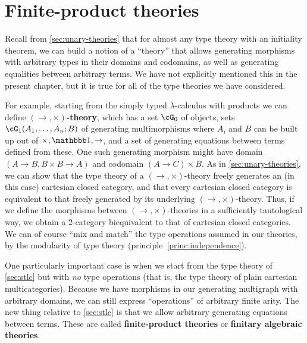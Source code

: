 \section{Finite-product theories}
\label{sec:fp-theories}

Recall from \cref{sec:unary-theories} that for almost any type theory with an initiality theorem, we can build a notion of a ``theory'' that allows generating morphisms with arbitrary types in their domains and codomains, as well as generating equalities between arbitrary terms.
We have not explicitly mentioned this in the present chapter, but it is true for all of the type theories we have considered.

For example, starting from the simply typed $\lambda$-calculus with products we can define \textbf{$(\to,\times)$-theory}, which has a set $\cG_0$ of objects, sets $\cG_1(A_1,\dots,A_n;B)$ of generating multimorphisms where $A_i$ and $B$ can be built up out of $\times,\unit,\to$, and a set of generating equations between terms defined from these.
One such generating morphism might have domain $(A\to B, B\times B\to A)$ and codomain $(A\to C)\times B$.
As in \cref{sec:unary-theories}, we can show that the type theory of a $(\to,\times)$-theory freely generates an (in this case) cartesian closed category, and that every cartesian closed category is equivalent to that freely generated by its underlying $(\to,\times)$-theory.
Thus, if we define the morphisms between $(\to,\times)$-theories in a sufficiently tautological way, we obtain a 2-category biequivalent to that of cartesian closed categories.
We can of course ``mix and match'' the type operations assumed in our theories, by the modularity of type theory (principle~\eqref{princ:independence}).

One particularly important case is when we start from the type theory of \cref{sec:stlc} but with \emph{no} type operations (that is, the type theory of plain cartesian multicategories).
Because we have morphisms in our generating multigraph with arbitrary domains, we can still express ``operations'' of arbitrary finite arity.
The new thing relative to \cref{sec:stlc} is that we allow arbitrary generating equations between terms.
These are called \textbf{finite-product theories} or \textbf{finitary algebraic theories}.

